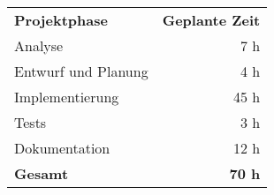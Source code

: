 \begin{tabular}{lr}
\rowcolor{heading}\textbf{Projektphase} & \textbf{Geplante Zeit} \\
Analyse & 7 h \\
\rowcolor{odd}Entwurf und Planung & 4 h \\
Implementierung & 45 h \\
\rowcolor{odd}Tests & 3 h \\
Dokumentation & 12 h \\
\hline
\hline
\rowcolor{odd}\textbf{Gesamt} & \textbf{70 h} \\
\end{tabular}
